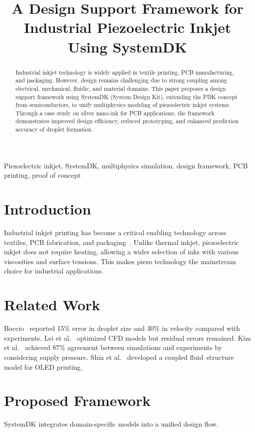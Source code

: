 \documentclass[conference]{IEEEtran}
\title{A Design Support Framework for Industrial Piezoelectric Inkjet Using SystemDK}
\author{%
  \IEEEauthorblockN{Shinichi Samizo}
  \IEEEauthorblockA{Independent Semiconductor Researcher\\
  Former Engineer at Seiko Epson Corporation\\
  Email: \href{mailto:shin3t72@gmail.com}{shin3t72@gmail.com}\\
  GitHub: \url{https://github.com/Samizo-AITL}}%
}
\begin{document}
\maketitle

\begin{abstract}
Industrial inkjet technology is widely applied in textile printing, PCB manufacturing, and packaging. 
However, design remains challenging due to strong coupling among electrical, mechanical, fluidic, and material domains. 
This paper proposes a design support framework using SystemDK (System Design Kit), extending the PDK concept from semiconductors, to unify multiphysics modeling of piezoelectric inkjet systems. 
Through a case study on silver nano-ink for PCB applications, the framework demonstrates improved design efficiency, reduced prototyping, and enhanced prediction accuracy of droplet formation.
\end{abstract}

\begin{IEEEkeywords}
Piezoelectric inkjet, SystemDK, multiphysics simulation, design framework, PCB printing, proof of concept
\end{IEEEkeywords}

\section{Introduction}
Industrial inkjet printing has become a critical enabling technology across textiles, PCB fabrication, and packaging~\cite{derby2010,calvert2001}. 
Unlike thermal inkjet, piezoelectric inkjet does not require heating, allowing a wider selection of inks with various viscosities and surface tensions. 
This makes piezo technology the mainstream choice for industrial applications. 

\section{Related Work}
Boccio~\cite{boccio2003} reported 15\% error in droplet size and 30\% in velocity compared with experiments. 
Lei et al.~\cite{lei2012} optimized CFD models but residual errors remained. 
Kim et al.~\cite{kim2022} achieved 87\% agreement between simulations and experiments by considering supply pressure. 
Shin et al.~\cite{shin2025} developed a coupled fluid--structure model for OLED printing. 

\section{Proposed Framework}
SystemDK integrates domain-specific models into a unified design flow.  
\end{document}
